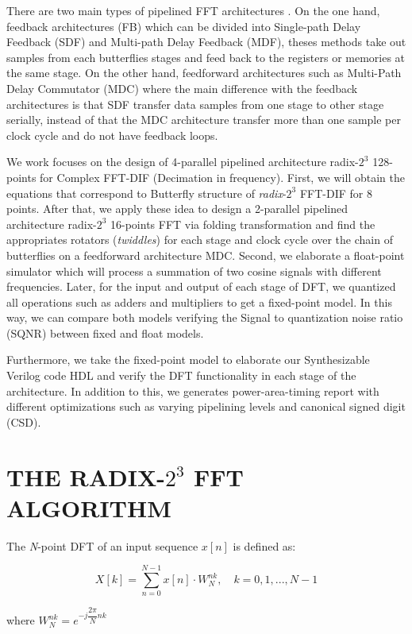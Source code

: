 \documentclass[journal,comsoc]{IEEEtran}
\begin{document}
There are two main types of pipelined FFT architectures \cite{shousheng_he_designing_1998}. On the one hand, feedback architectures (FB) which can be divided into Single-path Delay Feedback (SDF) and Multi-path Delay Feedback (MDF), theses methods take out samples from each butterflies stages and feed back to the registers or memories at the same stage. On the other hand, feedforward architectures such as Multi-Path Delay Commutator (MDC) where the main difference with the feedback architectures is that SDF transfer data samples from one stage to other stage serially, instead of that the MDC architecture transfer more than one sample per clock cycle and do not have feedback loops.

We work focuses on the design of 4-parallel pipelined architecture radix-$2^3$ 128-points for Complex FFT-DIF (Decimation in frequency). First, we will obtain the equations that correspond to Butterfly structure of \textit{radix}-$2^3$ FFT-DIF for 8 points. After that, we apply these idea to design a 2-parallel pipelined architecture radix-$2^3$ 16-points FFT via folding transformation and find the appropriates rotators (\textit{twiddles}) for each stage and clock cycle over the chain of butterflies on a feedforward architecture MDC. Second, we elaborate a float-point simulator which will process a summation of two cosine signals with different frequencies. Later, for the input and output of each stage of DFT, we quantized all operations such as adders and multipliers to get a fixed-point model. In this way, we can compare both models verifying the Signal to quantization noise ratio (SQNR) between fixed and float models.

Furthermore, we take the fixed-point model to elaborate our Synthesizable Verilog code HDL and verify the DFT functionality in each stage of the architecture. In addition to this, we generates power-area-timing report with different optimizations such as varying pipelining levels and canonical signed digit (CSD).
\section{THE RADIX-$2^3$ FFT ALGORITHM}
The \textit{N}-point DFT of an input sequence $x[n]$ is defined as:

\begin{equation}
	X[k] = \sum_{n=0}^{N-1} x[n] \cdot W_N^{nk}, \quad k=0,1,...,N-1
\end{equation}

where $W_N^{nk} = e^{-j\dfrac{2\pi}{N} nk}$ 
\end{document}
